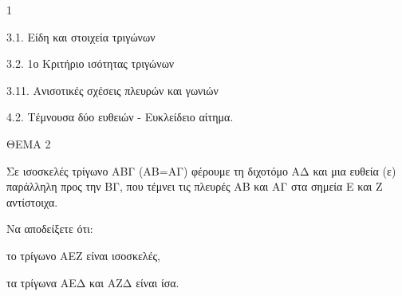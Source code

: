 \begin{ylh}{1}
    \item 3.1. Είδη και στοιχεία τριγώνων
    \item 3.2. 1ο Κριτήριο ισότητας τριγώνων
    \item 3.11. Ανισοτικές σχέσεις πλευρών και γωνιών
    \item 4.2. Τέμνουσα δύο ευθειών - Ευκλείδειο αίτημα.
\end{ylh}

ΘΕΜΑ 2

Σε ισοσκελές τρίγωνο ΑΒΓ (ΑΒ=ΑΓ) φέρουμε τη διχοτόμο ΑΔ και μια ευθεία (ε) παράλληλη προς την ΒΓ, που τέμνει τις πλευρές ΑΒ και ΑΓ στα σημεία Ε και Ζ αντίστοιχα.

Να αποδείξετε ότι:

\begin{alist}
\item το τρίγωνο ΑΕΖ είναι ισοσκελές, 

\item τα τρίγωνα ΑΕΔ και ΑΖΔ είναι ίσα. 


\begin{center}
\end{center}
\end{alist}
